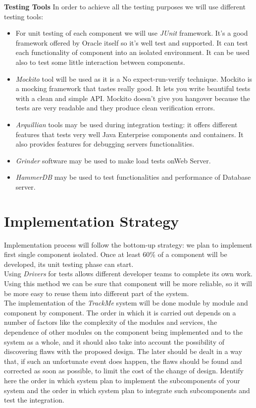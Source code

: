\documentclass[a4paper, hidelinks, 12pt]{report}
\begin{document}
\textbf{Testing Tools} In order to achieve all the testing purposes we will use different testing tools:
\begin{itemize}
\item{} For unit testing of each component we will use \textit{JUnit} framework. It’s a good framework offered by Oracle itself so it’s well test and supported. It can test each functionality of component into an isolated environment. It can be used also to test some little interaction between components.
\item{}\textit{Mockito} tool will be used as it is a No expect-run-verify technique. Mockito is a mocking framework that tastes really good. It lets you write beautiful tests with a clean and simple API. Mockito doesn’t give you hangover because the tests are very readable and they produce clean verification errors.
\item{} \textit{Arquillian} tools may be used during integration testing: it offers different features that tests very well Java Enterprise components and containers. It also provides features for debugging servers functionalities.
\item{} \textit{Grinder} software may be used to make load tests onWeb Server.
\item{} \textit{HammerDB} may be used to test functionalities and performance of Database server.
\end{itemize}


\section{Implementation Strategy}
Implementation process will follow the bottom-up strategy: we plan to implement first single component isolated. Once at least 60\% of a component will be developed, its unit testing phase can start.\\
Using \textit{Drivers} for tests allows different developer teams to complete its own work. Using this method we can be sure that component will be more reliable, so it will be more easy to reuse them into different part of the system.\\

The implementation of the \textit{TrackMe} system will be done module by module and component by component. The order in which it is carried out depends on a number of factors like the complexity of the modules and services, the dependence of other modules on the component being implemented and to the system as a whole, and it should also take into account the possibility of discovering flaws with the proposed design. The later should be dealt in a way that, if such an unfortunate event does	happen, the flaws should be found and corrected as soon as possible, to limit the cost of the change of design. Identify here the order in which system plan to implement the subcomponents of your system and the order in which system plan to integrate such subcomponents and test the integration.\\
\end{document}

